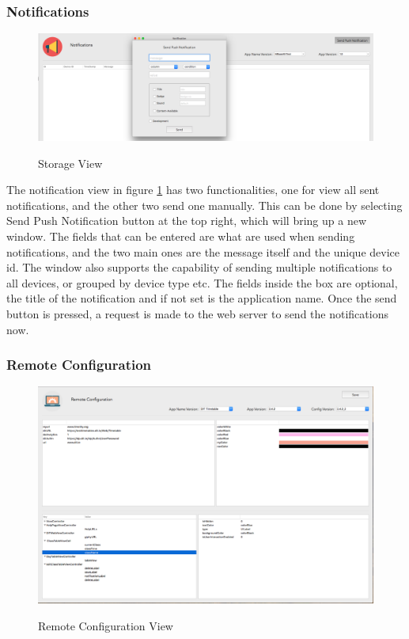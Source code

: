 \subsubsection{Notifications}

\begin{figure}[!h]
    \caption{Storage View}
    \centering
    \includegraphics[width=120mm]{images/dashboard/notifications}
    \label{fig:notification}
\end{figure}

The notification view in figure \ref{fig:notification} has two functionalities, one for view all sent notifications, and the other two send one manually. This can be done by selecting Send Push Notification button at the top right, which will bring up a new window. The fields that can be entered are what are used when sending notifications, and the two main ones are the message itself and the unique device id. The window also supports the capability of sending multiple notifications to all devices, or grouped by device type etc. The fields inside the box are optional, the title of the notification and if not set is the application name. Once the send button is pressed, a request is made to the web server to send the notifications now.

\subsubsection{Remote Configuration}

\begin{figure}[!h]
    \caption{Remote Configuration View}
    \centering
    \includegraphics[width=150mm]{images/dashboard/remote-config}
    \label{fig:remote-config-view}
\end{figure}

